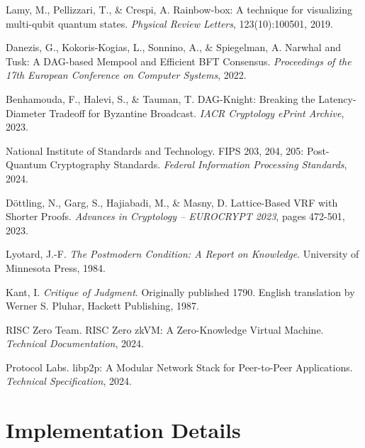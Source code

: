 \documentclass[12pt,a4paper]{article}
\begin{document}

\begin{thebibliography}{9}

Lamy, M., Pellizzari, T., \& Crespi, A.
\newblock Rainbow-box: A technique for visualizing multi-qubit quantum states.
\newblock \textit{Physical Review Letters}, 123(10):100501, 2019.

Danezis, G., Kokoris-Kogias, L., Sonnino, A., \& Spiegelman, A.
\newblock Narwhal and Tusk: A DAG-based Mempool and Efficient BFT Consensus.
\newblock \textit{Proceedings of the 17th European Conference on Computer Systems}, 2022.

Benhamouda, F., Halevi, S., \& Tauman, T.
\newblock DAG-Knight: Breaking the Latency-Diameter Tradeoff for Byzantine Broadcast.
\newblock \textit{IACR Cryptology ePrint Archive}, 2023.

National Institute of Standards and Technology.
\newblock FIPS 203, 204, 205: Post-Quantum Cryptography Standards.
\newblock \textit{Federal Information Processing Standards}, 2024.

Döttling, N., Garg, S., Hajiabadi, M., \& Masny, D.
\newblock Lattice-Based VRF with Shorter Proofs.
\newblock \textit{Advances in Cryptology – EUROCRYPT 2023}, pages 472-501, 2023.

Lyotard, J.-F.
\newblock \textit{The Postmodern Condition: A Report on Knowledge}.
\newblock University of Minnesota Press, 1984.

Kant, I.
\newblock \textit{Critique of Judgment}.
\newblock Originally published 1790. English translation by Werner S. Pluhar, Hackett Publishing, 1987.

RISC Zero Team.
\newblock RISC Zero zkVM: A Zero-Knowledge Virtual Machine.
\newblock \textit{Technical Documentation}, 2024.

Protocol Labs.
\newblock libp2p: A Modular Network Stack for Peer-to-Peer Applications.
\newblock \textit{Technical Specification}, 2024.

\end{thebibliography}

\appendix

\section{Implementation Details}
\end{document}
